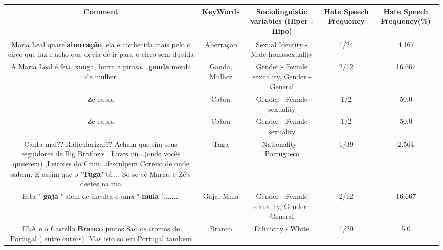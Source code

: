 \documentclass[11pt]{article}
\newlength\mylength
\begin{document}
\begin{center}
\setlength\mylength{\dimexpr\textwidth - 1\arrayrulewidth - 50\tabcolsep}
\begin{longtable}{|C{.65\mylength}|C{.30\mylength}|C{.12\mylength}|C{.12\mylength}|C{.12\mylength}|}
\hline
\textbf{Comment} & \textbf{KeyWords} & \textbf{Sociolinguistic variables (Hiper - Hipo)}  & \textbf{Hate Speech Frequency} & \textbf{Hate Speech Frequency(\%)} \\
\hline{}\small Maria Leal quase \textbf{aberração}, ela é conhecida mais pelo o circo que faz e acho que devia de ir para o circo sem duvida\normalsize   & Aberração & Sexual Identity - Male homosexuality & 1/24 & 4.167 \\  \hline
  \small A Maria Leal é feia, xunga, burra e pirosa….\textbf{ganda} merda de mulher\normalsize   & Ganda, Mulher & Gender - Female sexuality, Gender - General & 2/12 & 16.667 \\  \hline
  \small Ze  cabra\normalsize   & Cabra & Gender - Female sexuality & 1/2 & 50.0 \\  \hline
  \small Ze cabra\normalsize   & Cabra & Gender - Female sexuality & 1/2 & 50.0 \\  \hline
  \small Canta mal?? Ridicularizar?? Acham que sim seus seguidores de Big Brothers , Loves on...(onde vocês quiserem) ,Leitores do Crim...desculpem Correio de onde sabem. E assim que o "\textbf{Tuga}"  tá.... Só se vê Marias e Zé`s destes na rua\normalsize   & Tuga & Nationality - Portuguese & 1/39 & 2.564 \\  \hline
  \small Esta " \textbf{gaja} " alem de inculta é uma " \textbf{mula} "........\normalsize   & Gaja, Mula & Gender - Female sexuality, Gender - General & 2/12 & 16.667 \\  \hline
  \small ELA e o Castello \textbf{Branco} juntos Sao os cromos de Portugal ( entre outros). Mas isto so em Portugal tambem\normalsize   & Branco & Ethnicity - White & 1/20 & 5.0 \\  \hline

\end{longtable}
\end{center}
\end{document}
